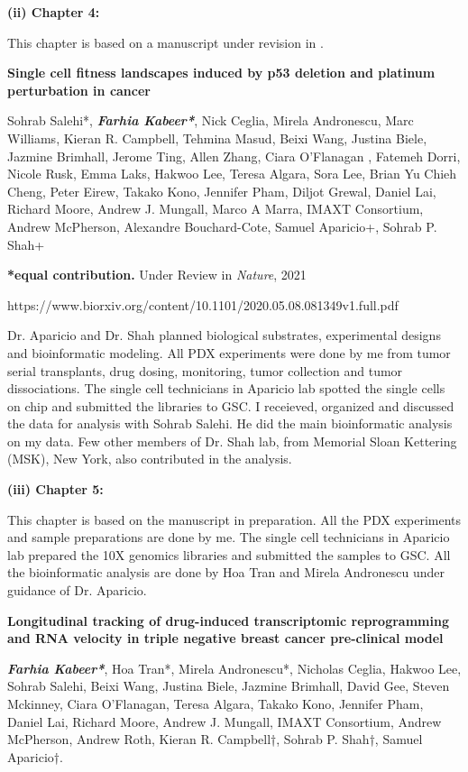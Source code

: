 
  \textbf{(ii) Chapter 4:}

This chapter is based on a manuscript under revision in .


 \textbf{Single  cell  fitness  landscapes  induced  by  p53  deletion and platinum perturbation in cancer}

Sohrab Salehi*, \emph{\textbf{Farhia Kabeer*}}, Nick Ceglia, Mirela Andronescu, Marc Williams, Kieran R. Campbell, Tehmina Masud, Beixi Wang, Justina Biele, Jazmine Brimhall, Jerome Ting, Allen Zhang, Ciara O'Flanagan , Fatemeh Dorri, Nicole Rusk, Emma Laks, Hakwoo Lee, Teresa Algara, Sora Lee, Brian Yu Chieh Cheng, Peter Eirew, Takako Kono, Jennifer Pham, Diljot Grewal, Daniel Lai, Richard Moore, Andrew J. Mungall, Marco A Marra, IMAXT Consortium, Andrew McPherson, Alexandre Bouchard-Cote, Samuel Aparicio+, Sohrab P. Shah+

 \textbf{*equal contribution.} Under Review in \textit{Nature}, 2021

https://www.biorxiv.org/content/10.1101/2020.05.08.081349v1.full.pdf

Dr. Aparicio and Dr. Shah planned biological substrates, experimental designs and bioinformatic modeling. All PDX experiments were done by me from tumor serial transplants, drug dosing, monitoring, tumor collection and tumor dissociations. The single cell technicians in Aparicio lab spotted the single cells on chip and submitted the libraries to \ac{GSC}.
I receieved, organized and discussed the data for analysis with Sohrab Salehi. He did the main bioinformatic analysis on my data. Few other members of Dr. Shah lab, from Memorial Sloan Kettering (MSK), New York, also contributed in the analysis. 


   \textbf{(iii) Chapter 5:}
   
This chapter is based on the manuscript in preparation. All the PDX experiments and sample preparations are done by me. The single cell technicians in Aparicio lab prepared the 10X genomics libraries and submitted the samples to \ac{GSC}. All the bioinformatic analysis are done by Hoa Tran and Mirela Andronescu under guidance of Dr. Aparicio.
  
\textbf{Longitudinal tracking of drug-induced transcriptomic reprogramming and RNA velocity in triple negative breast cancer pre-clinical model}

\emph{\textbf{Farhia Kabeer*}}, Hoa Tran*, Mirela Andronescu*,   
Nicholas Ceglia, Hakwoo Lee, Sohrab Salehi, Beixi Wang, Justina Biele, Jazmine Brimhall, David Gee, Steven Mckinney, Ciara O'Flanagan, Teresa Algara, Takako Kono, Jennifer Pham, Daniel Lai, Richard Moore, Andrew J. Mungall, IMAXT Consortium,  Andrew  McPherson, Andrew Roth, Kieran R. Campbell†, Sohrab P. Shah†, Samuel Aparicio†.